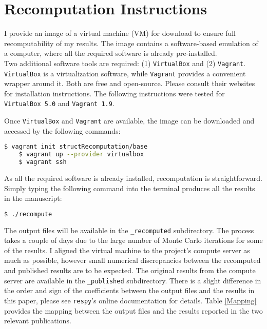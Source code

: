 \section{Recomputation Instructions}
I provide an image of a virtual machine (VM) for download to ensure full recomputability of my results. The image contains a software-based emulation of a computer, where all the required software is already pre-installed.\\\newline
%
Two additional software tools are required: (1)  \texttt{VirtualBox} and (2) \texttt{Vagrant}. \texttt{VirtualBox} is a virtualization software, while \texttt{Vagrant} provides a convenient wrapper around it. Both are free and open-source. Please consult their websites for installation instructions. The following instructions were tested for \texttt{VirtualBox 5.0} and \texttt{Vagrant 1.9}.\newline

Once \texttt{VirtualBox} and \texttt{Vagrant} are available, the image can be downloaded and accessed by the following commands:

\vspace{0.2cm}\begin{lstlisting}[language=bash]
    $ vagrant init structRecomputation/base
    $ vagrant up --provider virtualbox
    $ vagrant ssh
\end{lstlisting}\vspace{0.2cm}

As all the required software is already installed, recomputation is straightforward. Simply typing the following command into the terminal produces all the results in the manuscript:
\vspace{0.2cm}\begin{lstlisting}[language=bash]
    $ ./recompute
\end{lstlisting}\vspace{0.2cm}

The output files will be available in the \verb+_recomputed+ subdirectory. The process takes a couple of days due to the large number of Monte Carlo iterations for some of the results. I aligned the virtual machine to the project's compute server as much as possible, however small numerical discrepancies between the recomputed and published results are to be expected. The original results from the compute server are available in the \verb+_published+ subdirectory. There is a slight difference in the order and sign of the coefficients between the output files and the results in this paper, please see  \verb+respy+'s online documentation for details. Table \ref{Mapping} provides the mapping between the output files and the results reported in the two relevant publications.


